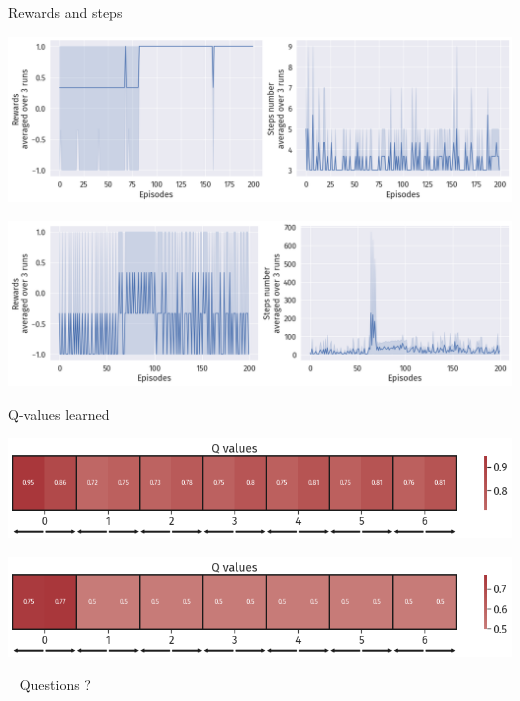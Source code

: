 \documentclass[bigger]{beamer}
\begin{document}
\begin{frame}[label={sec:orgdb598ea}]{Rewards and steps}
\begin{center}
\includegraphics[width=.9\linewidth]{img/DRL-rewards-steps.png}
\end{center}
\begin{center}
\includegraphics[width=.9\linewidth]{img/DRL-rewards-steps2.png}
\end{center}
\end{frame}
\begin{frame}[label={sec:orgfea7cc7}]{Q-values learned}
\begin{center}
\includegraphics[width=\textwidth]{img/DRL-q-values.png}
\end{center}
\begin{center}
\includegraphics[width=\textwidth]{img/DRL-q-values2.png}
\end{center}
\end{frame}
\begin{frame}[label={sec:org9e38211},standout]{~}
Questions ?
\end{frame}
\end{document}
